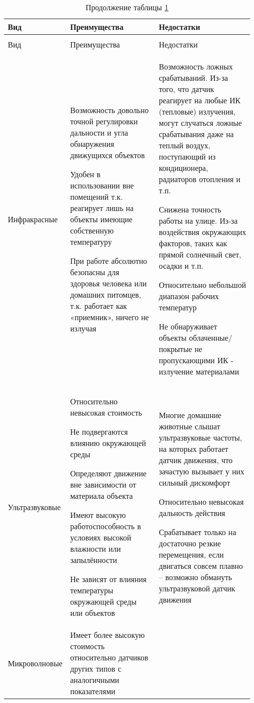 \begin{longtable}[t]{@{\extracolsep{\fill}}|l|@{\hskip-14pt}p{}|@{\hskip-14pt}p{}|}
	\caption{Сравнение видов датчиков} \label{offert2} \\ \hline
	Вид & Преимущества & Недостатки \\ \hline
	\endfirsthead
	\caption* {Продолжение таблицы \ref{offert2}}\\ \hline
	Вид & Преимущества & Недостатки \\ \hline
	\endhead
	Инфракрасные	&
		Возможность довольно точной регулировки дальности и угла обнаружения движущихся объектов

		Удобен в использовании вне помещений т.к. реагирует лишь на объекты имеющие собственную температуру

		При работе абсолютно безопасны для здоровья человека или домашних питомцев, т.к. работает как «приемник», ничего не излучая
					&
		Возможность ложных срабатываний. Из-за того, что датчик реагирует на любые ИК (тепловые) излучения, могут случаться ложные срабатывания даже на теплый воздух, поступающий из кондиционера, радиаторов отопления и т.п.

		Снижена точность работы на улице. Из-за воздействия окружающих факторов, таких как прямой солнечный свет, осадки и т.п.

		Относительно небольшой диапазон рабочих температур

		Не обнаруживает объекты облаченные/покрытые не пропускающими ИК - излучение материалами
		\\ \hline
	Ультразвуковые	&
		Относительно невысокая стоимость

		Не подвергаются влиянию окружающей среды

		Определяют движение вне зависимости от материала объекта

		Имеют высокую работоспособность в условиях высокой влажности или запылённости

		Не зависят от влияния температуры окружающей среды или объектов
					&
		Многие домашние животные слышат ультразвуковые частоты, на которых работает датчик движения, что зачастую вызывает у них сильный дискомфорт

		Относительно невысокая дальность действия

		Срабатывает только на достаточно резкие перемещения, если двигаться совсем плавно – возможно обмануть ультразвуковой датчик движения
		\\ \hline
	Микроволновые	&
		Имеет более высокую стоимость относительно датчиков других типов с аналогичными показателями


\end{longtable}
